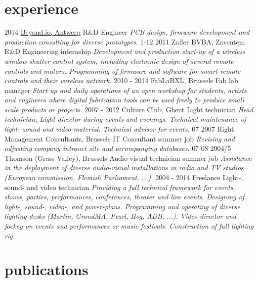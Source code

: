 \documentclass[print]{friggeri-cv}
\begin{document}
\section{experience}

\begin{entrylist}
  \entry
    {2014}
    {\href{http://beyond.io}{Beyond.io, Antwerp}}
    {R\&D Engineer}
    {\emph{PCB design, firmware development and production consulting for diverse prototypes.}}
  \entry
    {1-12 2011}
    {Zaffer BVBA, Zaventem}
    {R\&D Engineering internship}
    {\emph{Development and production start-up of a wireless window-shutter control system, including electronic design of several remote controls and motors. Programming of firmware and software for smart remote controls and their wireless network.}}
  \entry
    {2010 - 2014}
    {FabLaBXL, Brussels}
    {Fab lab manager}
    {\emph{Start up and daily operations of an open workshop for students, artists and engineers where digital fabrication tools can be used freely to produce small scale products or projects.}}
  \entry
    {2007 - 2012}
    {Culture Club, Ghent}
    {Light technician}
    {\emph{Head technician, Light director during events and evenings. Technical maintenance of light- sound and video-material. Technical advisor for events.}}
  \entry
    {07 2007}
    {Right Management Consultants, Brussels}
    {IT Consultant summer job}
    {\emph{Revising and adjusting company intranet site and accompanying databases.}}
  \entry
    {07-08 2004/5}
    {Thomson (Grass Valley), Brussels}
    {Audio-visual technician summer job}
    {\emph{Assistance in the deployment of diverse audio-visual installations in radio and TV studios (European commission, Flemish Parliament, ...).}}
  \entry
    {2004 - 2014}
    {Freelance}
    {Light-, sound- and video technician}
    {\emph{Providing a full technical framework for events, shows, parties, performances, conferences, theater and live events. Designing of light-, sound-, video-, and power-plans. Programming and operating of diverse lighting desks (Martin, GrandMA, Pearl, Hog, ADB, ...). Video director and jockey on events and performances or music festivals. Construction of full lighting rig.}}
\end{entrylist}

\section{publications}


\begin{refsection}
  \nocite{*}
  \printbibliography[sorting=chronological, type=inproceedings, title={international peer-reviewed conferences/proceedings}, notkeyword={france}, heading=subbibliography]
\end{refsection}
\begin{refsection}
  \nocite{*}
  \printbibliography[sorting=chronological, type=inproceedings, title={local peer-reviewed conferences/proceedings}, keyword={france}, heading=subbibliography]
\end{refsection}
\end{document}
